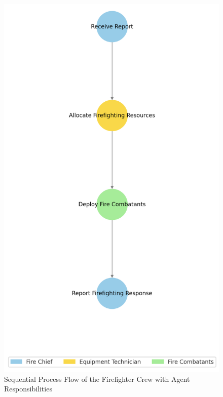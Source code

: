 \begin{figure}[ht!]
	\centering
	\includegraphics[height=0.59\textheight]{figures/Firefighter_Crew_Flow.png}
	\caption{Sequential Process Flow of the Firefighter Crew with Agent Responsibilities}
	\label{fig:firefighter_flow}
\end{figure}

